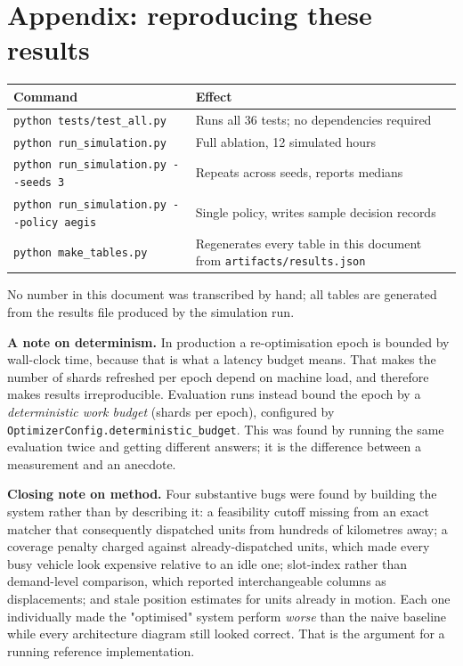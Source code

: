 \section{Appendix: reproducing these results}

\begin{center}\footnotesize
\begin{tabular}{@{}ll@{}}
\toprule
\textbf{Command} & \textbf{Effect} \\
\midrule
\texttt{python tests/test\_all.py} & Runs all 36 tests; no dependencies required \\
\texttt{python run\_simulation.py} & Full ablation, 12 simulated hours \\
\texttt{python run\_simulation.py -{}-seeds 3} & Repeats across seeds, reports medians \\
\texttt{python run\_simulation.py -{}-policy aegis} & Single policy, writes sample decision records \\
\texttt{python make\_tables.py} & Regenerates every table in this document from \texttt{artifacts/results.json} \\
\bottomrule
\end{tabular}
\end{center}

\noindent No number in this document was transcribed by hand; all tables are
generated from the results file produced by the simulation run.

\begin{keybox}
\textbf{A note on determinism.} In production a re-optimisation epoch is
bounded by wall-clock time, because that is what a latency budget means. That
makes the number of shards refreshed per epoch depend on machine load, and
therefore makes results irreproducible. Evaluation runs instead bound the epoch
by a \emph{deterministic work budget} (shards per epoch), configured by
\texttt{OptimizerConfig.deterministic\_budget}. This was found by running the
same evaluation twice and getting different answers; it is the difference
between a measurement and an anecdote.
\end{keybox}

\vspace{6mm}
\begin{keybox}
\textbf{Closing note on method.} Four substantive bugs were found by building
the system rather than by describing it: a feasibility cutoff missing from an
exact matcher that consequently dispatched units from hundreds of kilometres
away; a coverage penalty charged against already-dispatched units, which made
every busy vehicle look expensive relative to an idle one; slot-index rather
than demand-level comparison, which reported interchangeable columns as
displacements; and stale position estimates for units already in motion. Each
one individually made the "optimised" system perform \emph{worse} than the
naive baseline while every architecture diagram still looked correct. That is
the argument for a running reference implementation.
\end{keybox}


